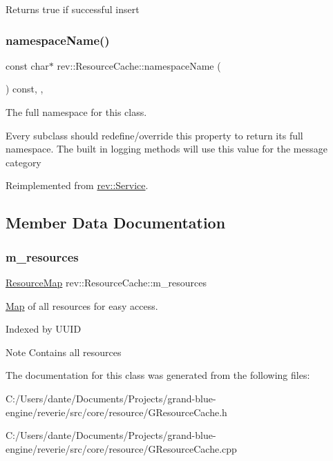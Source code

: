 Returns true if successful insert \mbox{\label{classrev_1_1_resource_cache_a4ed6a3f7ea5e8ea20287a5bce1fa05b9}} 
\subsubsection{\texorpdfstring{namespaceName()}{namespaceName()}}
{\footnotesize\ttfamily const char$\ast$ rev\+::\+Resource\+Cache\+::namespace\+Name (\begin{DoxyParamCaption}{ }\end{DoxyParamCaption}) const\hspace{0.3cm}{\ttfamily [inline]}, {\ttfamily [override]}, {\ttfamily [virtual]}}



The full namespace for this class. 

Every subclass should redefine/override this property to return its full namespace. The built in logging methods will use this value for the message category 

Reimplemented from \mbox{\hyperlink{classrev_1_1_service_a831f5bf8c53584ec830aaee38ea58e7b}{rev\+::\+Service}}.



\subsection{Member Data Documentation}
\mbox{\label{classrev_1_1_resource_cache_aabbe4f877eda212ea0b12e30cd5c519e}} 
\subsubsection{\texorpdfstring{m\_resources}{m\_resources}}
{\footnotesize\ttfamily \mbox{\hyperlink{classrev_1_1_threaded_map}{Resource\+Map}} rev\+::\+Resource\+Cache\+::m\+\_\+resources\hspace{0.3cm}{\ttfamily [protected]}}



\mbox{\hyperlink{classrev_1_1_map}{Map}} of all resources for easy access. 

Indexed by U\+U\+ID \begin{DoxyNote}{Note}
Contains all resources 
\end{DoxyNote}


The documentation for this class was generated from the following files\+:\begin{DoxyCompactItemize}
\item 
C\+:/\+Users/dante/\+Documents/\+Projects/grand-\/blue-\/engine/reverie/src/core/resource/G\+Resource\+Cache.\+h\item 
C\+:/\+Users/dante/\+Documents/\+Projects/grand-\/blue-\/engine/reverie/src/core/resource/G\+Resource\+Cache.\+cpp\end{DoxyCompactItemize}
